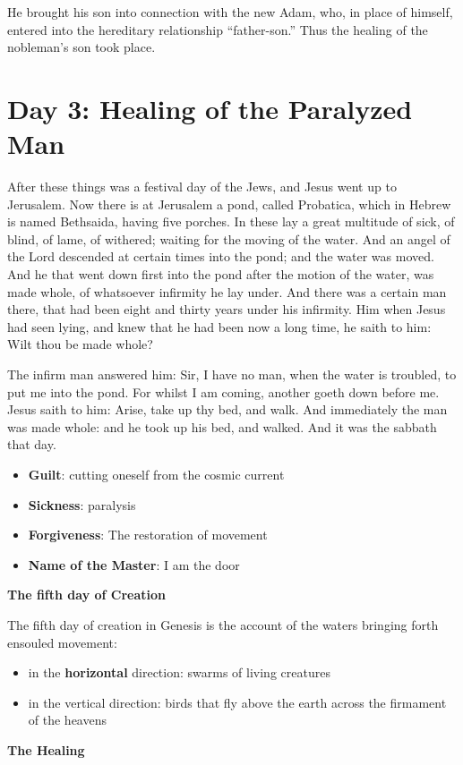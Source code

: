 \begin{quotex}
He brought his son into connection with the new Adam, who, in place of himself, entered into the hereditary relationship ``father-son.'' Thus the healing of the nobleman's son took place.

\end{quotex}

\section{Day 3: Healing of the Paralyzed Man}

After these things was a festival day of the Jews, and Jesus went up to Jerusalem. Now there is at Jerusalem a pond, called Probatica, which in Hebrew is named Bethsaida, having five porches. In these lay a great multitude of sick, of blind, of lame, of withered; waiting for the moving of the water. And an angel of the Lord descended at certain times into the pond; and the water was moved. And he that went down first into the pond after the motion of the water, was made whole, of whatsoever infirmity he lay under. And there was a certain man there, that had been eight and thirty years under his infirmity. Him when Jesus had seen lying, and knew that he had been now a long time, he saith to him: Wilt thou be made whole?

The infirm man answered him: Sir, I have no man, when the water is troubled, to put me into the pond. For whilst I am coming, another goeth down before me. Jesus saith to him: Arise, take up thy bed, and walk. And immediately the man was made whole: and he took up his bed, and walked. And it was the sabbath that day.

\begin{itemize}
\item \textbf{Guilt}: cutting oneself from the cosmic current 
\item \textbf{Sickness}: paralysis 
\item \textbf{Forgiveness}: The restoration of movement 
\item \textbf{Name of the Master}: I am the door 
\end{itemize}
\textbf{The fifth day of Creation}

The fifth day of creation in Genesis is the account of the waters bringing forth ensouled movement:

\begin{itemize}
\item in the \textbf{horizontal} direction: swarms of living creatures 
\item in the vertical direction: birds that fly above the earth across the firmament of the heavens 
\end{itemize}
\textbf{The Healing}

